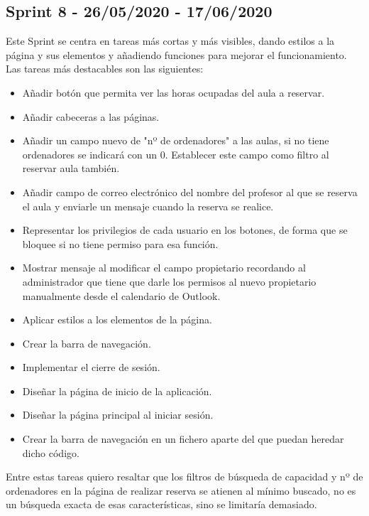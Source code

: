 \subsection{Sprint 8 - 26/05/2020 - 17/06/2020}
Este Sprint se centra en tareas más cortas y más visibles, dando estilos a la página y sus elementos y añadiendo funciones para mejorar el funcionamiento. Las tareas más destacables son las siguientes:
\begin{itemize}
    \item Añadir botón que permita ver las horas ocupadas del aula a reservar.
    \item Añadir cabeceras a las páginas.
    \item Añadir un campo nuevo de "nº de ordenadores" a las aulas, si no tiene ordenadores se indicará con un 0. Establecer este campo como filtro al reservar aula también.
    \item Añadir campo de correo electrónico del nombre del profesor al que se reserva el aula y enviarle un mensaje cuando la reserva se realice.
    \item Representar los privilegios de cada usuario en los botones, de forma que se bloquee si no tiene permiso para esa función.
    \item Mostrar mensaje al modificar el campo propietario recordando al administrador que tiene que darle los permisos al nuevo propietario manualmente desde el calendario de Outlook.
    \item Aplicar estilos a los elementos de la página.
    \item Crear la barra de navegación.
    \item Implementar el cierre de sesión.
    \item Diseñar la página de inicio de la aplicación.
    \item Diseñar la página principal al iniciar sesión.
    \item Crear la barra de navegación en un fichero aparte del que puedan heredar dicho código.
\end{itemize}
Entre estas tareas quiero resaltar que los filtros de búsqueda de capacidad y nº de ordenadores en la página de realizar reserva se atienen al mínimo buscado, no es un búsqueda exacta de esas características, sino se limitaría demasiado.

